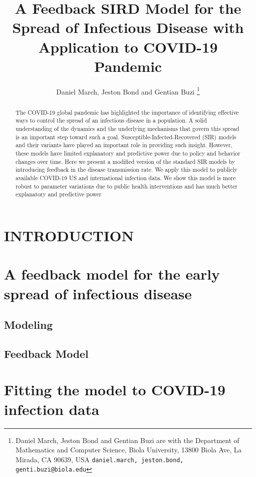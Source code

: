 \documentclass[letterpaper, 10 pt, conference]{ieeeconf}  %
\title{\LARGE \bf
A Feedback SIRD Model  for the Spread of Infectious Disease with Application to COVID-19 Pandemic
}
\author{Daniel March, Jeston Bond and Gentian Buzi%
\thanks{Daniel March, Jeston Bond and Gentian Buzi are with the Department of Mathematics and Computer Science,
       Biola University, 13800 Biola Ave, La Mirada, CA 90639, USA
        {\tt\small daniel.march, jeston.bond, genti.buzi@biola.edu}}%
}
\begin{document}
\maketitle
\thispagestyle{empty}
\pagestyle{empty}


\begin{abstract}

The COVID-19 global pandemic has highlighted the importance of identifying effective ways to control the spread of an infectious disease in a population. A solid understanding of the dynamics and the underlying mechanisms that govern this spread is an important step toward such a goal. Susceptible-Infected-Recovered (SIR) models and their variants have played an important role in providing such insight. However, these models have limited explanatory and predictive power due to policy and behavior changes over time. Here we present a modified version of the standard SIR models by introducing feedback in the disease transmission rate. We apply this model to publicly available COVID-19 US and international infection data. We show this model is more robust to parameter variations due to public health interventions and has much better explanatory and predictive power


\end{abstract}


\section{INTRODUCTION}


\section{A feedback model for the early spread of infectious disease}

\subsection{Modeling}

 

\subsection{Feedback Model}



\section{Fitting the model to COVID-19 infection data}
\end{document}
